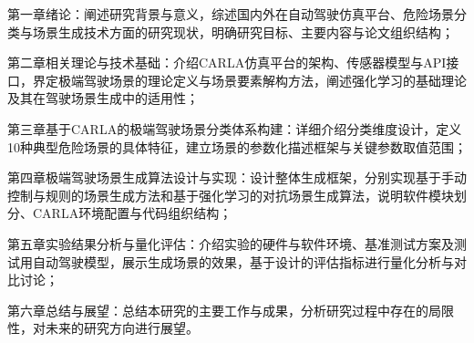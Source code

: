 第一章绪论：阐述研究背景与意义，综述国内外在自动驾驶仿真平台、危险场景分类与场景生成技术方面的研究现状，明确研究目标、主要内容与论文组织结构；

第二章相关理论与技术基础：介绍CARLA仿真平台的架构、传感器模型与API接口，界定极端驾驶场景的理论定义与场景要素解构方法，阐述强化学习的基础理论及其在驾驶场景生成中的适用性；

第三章基于CARLA的极端驾驶场景分类体系构建：详细介绍分类维度设计，定义10种典型危险场景的具体特征，建立场景的参数化描述框架与关键参数取值范围；

第四章极端驾驶场景生成算法设计与实现：设计整体生成框架，分别实现基于手动控制与规则的场景生成方法和基于强化学习的对抗场景生成算法，说明软件模块划分、CARLA环境配置与代码组织结构；

第五章实验结果分析与量化评估：介绍实验的硬件与软件环境、基准测试方案及测试用自动驾驶模型，展示生成场景的效果，基于设计的评估指标进行量化分析与对比讨论；

第六章总结与展望：总结本研究的主要工作与成果，分析研究过程中存在的局限性，对未来的研究方向进行展望。